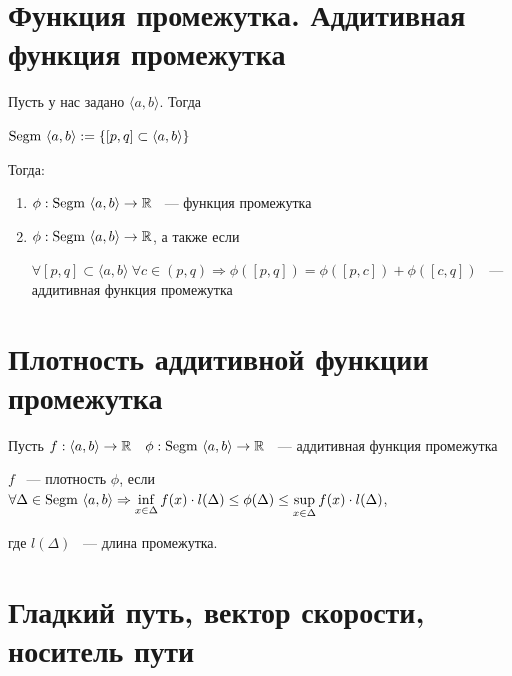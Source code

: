 \documentclass{article}
\begin{document}
	\section{Функция промежутка. Аддитивная функция промежутка}
	
        Пусть у нас задано $\langle a, b \rangle$. Тогда
        
        $\Segm \langle a, b \rangle := \left\{ [p, q] \subset \langle a, b \rangle \right\}$
        
        Тогда:
        
        \begin{enumerate}
        
            \item $\phi : \Segm \langle a, b \rangle \rightarrow \mathbb{R}$ ~--- функция промежутка
            
            \item $\phi : \Segm \langle a, b \rangle \rightarrow \mathbb{R}$, а также если
            
                $\forall [p, q] \subset \langle a, b \rangle \ \forall c \in (p, q) \Rightarrow \phi([p, q]) = \phi([p, c]) + \phi([c, q])$ ~--- аддитивная функция промежутка
                
        \end{enumerate}
        
    \newpage
    
    \section{Плотность аддитивной функции промежутка}
    
        Пусть $f : \langle a, b \rangle \rightarrow \mathbb{R} \ \ \ \phi: \Segm \langle a, b \rangle \rightarrow \mathbb{R}$ ~--- аддитивная функция промежутка
        
            $f$ ~--- плотность $\phi$, если $\forall \Delta \in \Segm \langle a, b \rangle \Rightarrow \inf\limits_{x \in \Delta} f(x) \cdot l(\Delta) \leq \phi(\Delta) \leq \sup\limits_{x \in \Delta} f(x) \cdot l(\Delta)$, 
            
            где $l(\Delta)$ ~--- длина промежутка.
		
    \newpage
    
    \section{Гладкий путь, вектор скорости, носитель пути}
    
\end{document}
